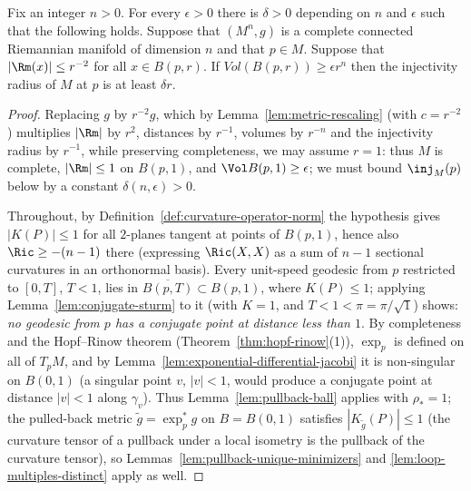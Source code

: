 \begin{theorem}
\label{thm:volume-injectivity-radius}
\label{volinj}

Fix an integer $n>0$. For every $\epsilon>0$ there is $\delta>0$
depending on $n$ and $\epsilon$ such that the following holds.
Suppose that $(M^n,g)$ is a complete connected Riemannian
manifold of dimension $n$ and that $p\in M$. Suppose that $|\Rm(x)|\le
r^{-2}$ for all $x\in B(p,r)$. If $Vol(B(p,r))\ge \epsilon r^n$ then
the injectivity radius of $M$ at $p$ is at least $\delta r$.
\end{theorem}

\begin{proof}
\sketch
{}
Replacing $g$ by $r^{-2}g$, which by
Lemma~\ref{lem:metric-rescaling} (with $c=r^{-2}$) multiplies
$|\Rm|$ by $r^{2}$,
distances by $r^{-1}$, volumes by $r^{-n}$ and the injectivity
radius by $r^{-1}$, while preserving completeness, we may assume
$r=1$: thus $M$ is
complete, $|\Rm|\le1$ on $B(p,1)$, and $\Vol B(p,1)\ge\epsilon$; we
must bound $\inj_M(p)$ below by a constant $\delta(n,\epsilon)>0$.

Throughout, by Definition~\ref{def:curvature-operator-norm} the
hypothesis gives $|K(P)|\le1$ for all $2$-planes tangent at points
of $B(p,1)$, hence also $\Ric\ge-(n-1)$ there (expressing
$\Ric(X,X)$ as a sum of $n-1$ sectional curvatures in an
orthonormal basis). Every unit-speed geodesic from $p$
restricted to $[0,T]$, $T<1$, lies in
$\overline{B(p,T)}\subset B(p,1)$, where $K(P)\le1$; applying
Lemma~\ref{lem:conjugate-sturm} to it (with $K=1$, and
$T<1<\pi=\pi/\sqrt{1}$)
shows: \emph{no geodesic from $p$ has a conjugate point at
distance less than $1$}. By
completeness and the Hopf--Rinow theorem
(Theorem~\ref{thm:hopf-rinow}(1)), $\exp_p$ is defined
on all of $T_pM$, and by
Lemma~\ref{lem:exponential-differential-jacobi} it is
non-singular on $B(0,1)$ (a singular point $v$, $|v|<1$, would
produce a conjugate point at distance $|v|<1$ along
$\gamma_v$). Thus
Lemma~\ref{lem:pullback-ball} applies with $\rho_*=1$; the
pulled-back metric $\tilde g=\exp_p^*g$ on $B=B(0,1)$
satisfies $|K_{\tilde g}(P)|\le1$ (the curvature tensor of a
pullback under a local isometry is the pullback of the curvature
tensor), so Lemmas~\ref{lem:pullback-unique-minimizers} and
\ref{lem:loop-multiples-distinct} apply as well.


\end{proof}
